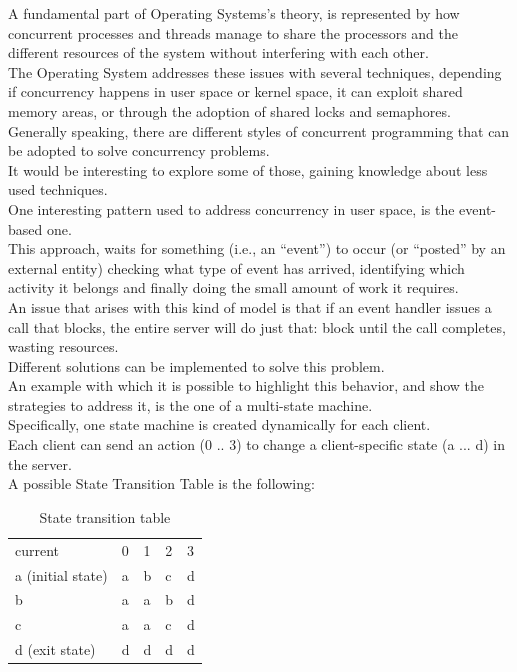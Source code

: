 \documentclass[10pt, oneside,english]{article}   	%
\begin{document}
A fundamental part of Operating Systems's theory, is represented by how concurrent processes and threads manage to share the processors and the different resources of the system without interfering with each other. \\
The Operating System addresses these issues with several techniques, depending if concurrency happens in user space or kernel space, it can exploit shared memory areas, or through the adoption of shared locks and semaphores.\\
Generally speaking, there are different styles of concurrent programming that can be adopted to solve concurrency problems.\\
It would be interesting to explore some of those, gaining knowledge about less used techniques.\\
One interesting pattern used to address concurrency in user space, is the event-based one.\\
This approach, waits for something (i.e., an “event”) to occur (or “posted” by an external entity) checking what type of event has arrived, identifying which activity it belongs and finally doing the small amount of work it requires.\\
An issue that arises with this kind of model is that if an event handler issues a call that blocks, the entire server will do just that: block until the call completes, wasting resources.\\
Different solutions can be implemented to solve this problem. \\
An example with which it is possible to highlight this behavior, and show the strategies to address it, is the one of a multi-state machine. \\
Specifically, one state machine is created dynamically for each client.\\
Each client can send an action (0 .. 3) to change a client-specific state (a ... d) in the server.\\
A possible State Transition Table is the following:

\begin{table}[H]
\centering
\begin{tabular}{lllll}
current           & 0 & 1 & 2 & 3 \\
a (initial state) & a & b & c & d \\
b                 & a & a & b & d \\
c                 & a & a & c & d \\
d (exit state)    & d & d & d & d
\end{tabular}
\caption{State transition table}
\label{State transition table}
\end{table}
\end{document}
